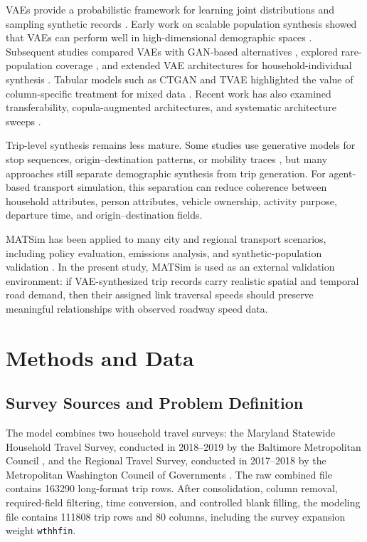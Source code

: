 \documentclass[3p,times,procedia]{elsarticle}
\begin{document}
VAEs provide a probabilistic framework for learning joint distributions and sampling synthetic records \cite{kingma_auto-encoding_2022}. Early work on scalable population synthesis showed that VAEs can perform well in high-dimensional demographic spaces \cite{borysov_scalable_2019}. Subsequent studies compared VAEs with GAN-based alternatives \cite{garrido_prediction_2020}, explored rare-population coverage \cite{kim2022regularized}, and extended VAE architectures for household-individual synthesis \cite{sane2025joint}. Tabular models such as CTGAN and TVAE highlighted the value of column-specific treatment for mixed data \cite{xu_modeling_2019}. Recent work has also examined transferability, copula-augmented architectures, and systematic architecture sweeps \cite{jutras-dube_copula-based_2024,sane_comprehensive_2024}.

Trip-level synthesis remains less mature. Some studies use generative models for stop sequences, origin--destination patterns, or mobility traces \cite{chiesa2022gps,long2023dual,lestyan2022dp,badu-marfo_composite_2022}, but many approaches still separate demographic synthesis from trip generation. For agent-based transport simulation, this separation can reduce coherence between household attributes, person attributes, vehicle ownership, activity purpose, departure time, and origin--destination fields.

MATSim has been applied to many city and regional transport scenarios, including policy evaluation, emissions analysis, and synthetic-population validation \cite{w2016multi,horl2021synthetic,horl2025towards,felbermair2020generating,ziemke2019matsim}. In the present study, MATSim is used as an external validation environment: if VAE-synthesized trip records carry realistic spatial and temporal road demand, then their assigned link traversal speeds should preserve meaningful relationships with observed roadway speed data.

\section{Methods and Data}
\subsection{Survey Sources and Problem Definition}
The model combines two household travel surveys: the Maryland Statewide Household Travel Survey, conducted in 2018--2019 by the Baltimore Metropolitan Council \cite{baltimoremetropolitancouncilMarylandTravel}, and the Regional Travel Survey, conducted in 2017--2018 by the Metropolitan Washington Council of Governments \cite{mwcog}. The raw combined file contains \num{163290} long-format trip rows. After consolidation, column removal, required-field filtering, time conversion, and controlled blank filling, the modeling file contains \num{111808} trip rows and 80 columns, including the survey expansion weight \texttt{wthhfin}.
\end{document}
